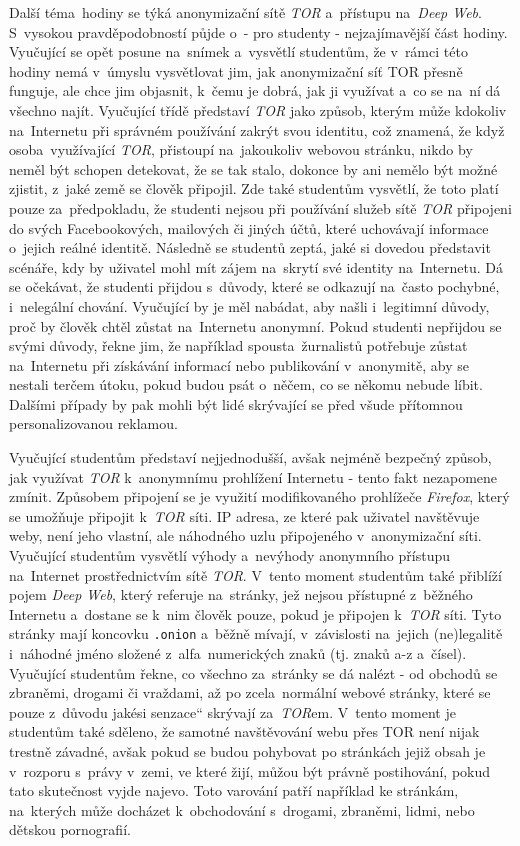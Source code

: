 \documentclass[a4paper, 12pt]{article}
\providecommand{\uv}[1]{\quotedblbase #1\textquotedblleft}
\begin{document}
Další téma~hodiny se týká anonymizační sítě \textit{TOR} a~přístupu na~\textit{Deep Web}. S~vysokou pravděpodobností půjde o~- pro studenty - nejzajímavější část hodiny. Vyučující se opět posune na~snímek a~vysvětlí studentům, že v~rámci této hodiny nemá v~úmyslu vysvětlovat jim, jak anonymizační síť TOR přesně funguje, ale chce jim objasnit, k~čemu je dobrá, jak ji využívat a~co se na~ní dá všechno najít. Vyučující třídě představí \textit{TOR} jako způsob, kterým může kdokoliv na~Internetu při správném používání zakrýt svou identitu, což znamená, že když osoba~využívající \textit{TOR}, přistoupí na~jakoukoliv webovou stránku, nikdo by neměl být schopen detekovat, že se tak stalo, dokonce by ani nemělo být možné zjistit, z~jaké země se člověk připojil. Zde také studentům vysvětlí, že toto platí pouze za~předpokladu, že studenti nejsou při používání služeb sítě \textit{TOR} připojeni do svých Facebookových, mailových či jiných účtů, které uchovávají informace o~jejich reálné identitě. Následně se studentů zeptá, jaké si dovedou představit scénáře, kdy by uživatel mohl mít zájem na~skrytí své identity na~Internetu. Dá se očekávat, že studenti přijdou s~důvody, které se odkazují na~často pochybné, i~nelegální chování. Vyučující by je měl nabádat, aby našli i~legitimní důvody, proč by člověk chtěl zůstat na~Internetu anonymní. Pokud studenti nepřijdou se svými důvody, řekne jim, že například spousta~žurnalistů potřebuje zůstat na~Internetu při získávání informací nebo publikování v~anonymitě, aby se nestali terčem útoku, pokud budou psát o~něčem, co se někomu nebude líbit. Dalšími případy by pak mohli být lidé skrývající se před všude přítomnou personalizovanou reklamou.

Vyučující studentům představí nejjednodušší, avšak nejméně bezpečný způsob, jak využívat \textit{TOR} k~anonymnímu prohlížení Internetu - tento fakt nezapomene zmínit. Způsobem připojení se je využití modifikovaného prohlížeče \textit{Firefox}, který se umožňuje připojit k~\textit{TOR} síti. IP adresa, ze které pak uživatel navštěvuje weby, není jeho vlastní, ale náhodného uzlu připojeného v~anonymizační síti. Vyučující studentům vysvětlí výhody a~nevýhody anonymního přístupu na~Internet prostřednictvím sítě \textit{TOR}. V~tento moment studentům také přiblíží pojem \textit{Deep Web}, který referuje na~stránky, jež nejsou přístupné z~běžného Internetu a~dostane se k~nim člověk pouze, pokud je připojen k~\textit{TOR} síti. Tyto stránky mají koncovku \texttt{.onion} a~běžně mívají, v~závislosti na~jejich (ne)legalitě i~náhodné jméno složené z~alfa~numerických znaků (tj. znaků a-z a~čísel). Vyučující studentům řekne, co všechno za~stránky se dá nalézt - od obchodů se zbraněmi, drogami či vraždami, až po zcela~normální webové stránky, které se pouze z~důvodu jakési \uv{senzace} skrývají za~\textit{TOR}em. V~tento moment je studentům také sděleno, že samotné navštěvování webu přes TOR není nijak trestně závadné, avšak pokud se budou pohybovat po stránkách jejiž obsah je v~rozporu s~právy v~zemi, ve které žijí, můžou být právně postihování, pokud tato skutečnost vyjde najevo. Toto varování patří například ke stránkám, na~kterých může docházet k~obchodování s~drogami, zbraněmi, lidmi, nebo dětskou pornografií.
\end{document}
